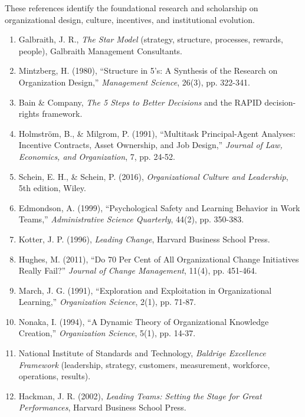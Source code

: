 These references identify the foundational research and scholarship on organizational design, culture, incentives, and institutional evolution.

\begin{enumerate}
    \item[\textbf{[G1]}] Galbraith, J. R., \textit{The Star Model} (strategy, structure, processes, rewards, people), Galbraith Management Consultants.
    \item[\textbf{[G2]}] Mintzberg, H. (1980), ``Structure in 5's: A Synthesis of the Research on Organization Design,'' \textit{Management Science}, 26(3), pp. 322-341.
    \item[\textbf{[G3]}] Bain \& Company, \textit{The 5 Steps to Better Decisions} and the RAPID decision-rights framework.
    \item[\textbf{[G4]}] Holmstr\"{o}m, B., \& Milgrom, P. (1991), ``Multitask Principal-Agent Analyses: Incentive Contracts, Asset Ownership, and Job Design,'' \textit{Journal of Law, Economics, and Organization}, 7, pp. 24-52.
    \item[\textbf{[G5]}] Schein, E. H., \& Schein, P. (2016), \textit{Organizational Culture and Leadership}, 5th edition, Wiley.
    \item[\textbf{[G6]}] Edmondson, A. (1999), ``Psychological Safety and Learning Behavior in Work Teams,'' \textit{Administrative Science Quarterly}, 44(2), pp. 350-383.
    \item[\textbf{[G7]}] Kotter, J. P. (1996), \textit{Leading Change}, Harvard Business School Press.
    \item[\textbf{[G8]}] Hughes, M. (2011), ``Do 70 Per Cent of All Organizational Change Initiatives Really Fail?'' \textit{Journal of Change Management}, 11(4), pp. 451-464.
    \item[\textbf{[G9]}] March, J. G. (1991), ``Exploration and Exploitation in Organizational Learning,'' \textit{Organization Science}, 2(1), pp. 71-87.
    \item[\textbf{[G10]}] Nonaka, I. (1994), ``A Dynamic Theory of Organizational Knowledge Creation,'' \textit{Organization Science}, 5(1), pp. 14-37.
    \item[\textbf{[G11]}] National Institute of Standards and Technology, \textit{Baldrige Excellence Framework} (leadership, strategy, customers, measurement, workforce, operations, results).
    \item[\textbf{[G12]}] Hackman, J. R. (2002), \textit{Leading Teams: Setting the Stage for Great Performances}, Harvard Business School Press.
\end{enumerate}


